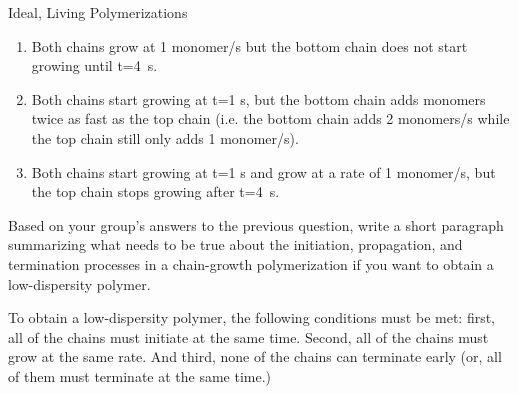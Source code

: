 \begin{activity}{Ideal, Living Polymerizations}
\begin{ctqs}
\begin{enumerate}
			\item Both chains grow at 1 monomer/s but the bottom chain does not start growing until t=4~s.
			
				\begin{solution}[0.55in]\studentdisplay{~
				}
				\end{solution}

			\item Both chains start growing at t=1 s, but the bottom chain adds monomers twice as fast as the top chain (i.e. the bottom chain adds 2 monomers/s while the top chain still only adds 1 monomer/s).
			
				\begin{solution}[0.5in]\studentdisplay{~
				}
				\end{solution}

			\item Both chains start growing at t=1 s and grow at a rate of 1 monomer/s, but the top chain stops growing after t=4~s.
			
				\begin{solution}[0.5in]\studentdisplay{~
				}
				\end{solution}
				
		\end{enumerate}
		
	\question Based on your group's answers to the previous question, write a short paragraph summarizing what needs to be true about the initiation, propagation, and termination processes in a chain-growth polymerization if you want to obtain a low-dispersity polymer.
	
		\begin{solution}[2in]
			To obtain a low-dispersity polymer, the following conditions must be met: first, all of the chains must initiate at the same time.  Second, all of the chains must grow at the same rate.  And third, none of the chains can terminate early (or, all of them must terminate at the same time.)
		\end{solution}

\end{ctqs}

\begin{infobox}


\end{infobox}
\end{activity}
